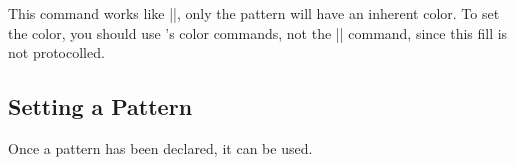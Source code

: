 \begin{command}{\pgfdeclarepatterninherentlycolored
}
    This command works like |\pgfdeclarepatternuncolored|, only the pattern
    will have an inherent color. To set the color, you should use \pgfname's
    color commands, not the |\color| command, since this fill is not
    protocolled.
\begin{codeexample}[preamble={\usetikzlibrary{patterns}}]
{\pgfpointorigin}{\pgfpoint{1cm}{1cm}}
{\pgfpoint{1cm}{1cm}}
{
  \pgftransformshift{\pgfpoint{.5cm}{.5cm}}
  \pgfpathclose%
}
\end{codeexample}
\end{command}


\subsection{Setting a Pattern}

Once a pattern has been declared, it can be used.

